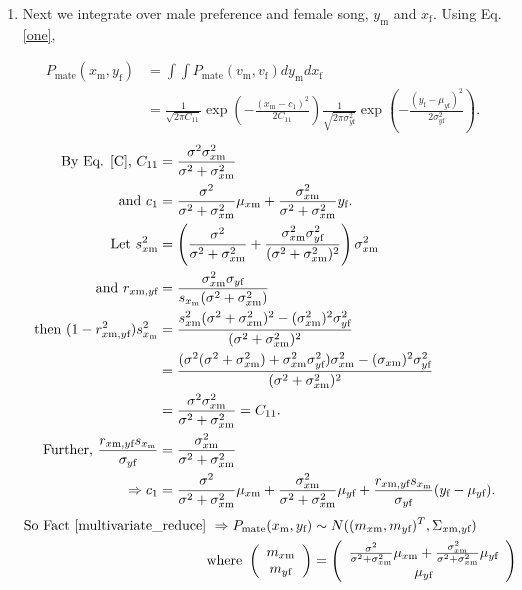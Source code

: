 \documentclass{article}
\newcommand{\x}[1]{\text{#1}}
\begin{document}
\begin{pf}
\begin{enumerate}
\item Next we integrate over male preference and female song, $y_\x{m}$ and $x_\x{f}$. Using Eq. \ref{one},

\begin{align*}
P_\text{mate}(x_\x{m},y_\x{f})&=\int \int P_\text{mate}(v_\x{m},v_\x{f})dy_\x{m}dx_\x{f}
\\&=\frac{1}{\sqrt{2\pi C_{11}}}\exp\left(-\frac{(x_\x{m}-c_1)^2}{2C_{11}}\right)\frac{1}{\sqrt{2\pi \sigma_{y\x{f}}^2}}\exp\left(-\frac{(y_\x{f}-\mu_{y\x{f}})^2}{2\sigma_{y\x{f}}^2}\right).
\end{align*}
\begin{align*}
\text{By Eq. \ref{C}, } C_{11}&=\frac{\sigma^2\sigma_{x\x{m}}^2}{\sigma^2+\sigma_{x\x{m}}^2}
\\ \text{ and } c_1&=\frac{\sigma^2}{\sigma^2+\sigma_{x\x{m}}^2}\mu_{x\x{m}}+\frac{\sigma_{x\x{m}}^2}{\sigma^2+\sigma_{x\x{m}}^2}y_\x{f}.
\\ \text{ Let } s_{x\x{m}}^2&=\left(\frac{\sigma^2}{\sigma^2+\sigma_{x\x{m}}^2}+\frac{\sigma_{x\x{m}}^2\sigma_{y\x{f}}^2}{(\sigma^2+\sigma_{x\x{m}}^2)^2}\right)\sigma_{x\x{m}}^2
\\ \text{ and } r_{x\x{m},y\x{f}}&=\frac{\sigma_{x\x{m}}^2\sigma_{y\x{f}}}{s_{x_\x{m}}(\sigma^2+\sigma_{x\x{m}}^2)}
\\ \text{ then } (1-r_{x\x{m},y\x{f}}^2)s_{x_\x{m}}^2&=\frac{s_{x\x{m}}^2(\sigma^2+\sigma_{x\x{m}}^2)^2-(\sigma_{x\x{m}}^2)^2\sigma_{y\x{f}}^2}{(\sigma^2+\sigma_{x\x{m}}^2)^2}
\\&=\frac{(\sigma^2(\sigma^2+\sigma_{x\x{m}}^2)+\sigma_{x\x{m}}^2\sigma_{y\x{f}}^2)\sigma_{x\x{m}}^2-(\sigma_{x\x{m}})^2\sigma_{y\x{f}}^2}{(\sigma^2+\sigma_{x\x{m}}^2)^2}
\\&=\frac{\sigma^2\sigma_{x\x{m}}^2}{\sigma^2+\sigma_{x\x{m}}^2}=C_{11}.
\\\text{ Further, } \frac{r_{x\x{m},y\x{f}}s_{x_\x{m}}}{\sigma_{y\x{f}}}&=\frac{\sigma_{x\x{m}}^2}{\sigma^2+\sigma_{x\x{m}}^2}
\\ \Rightarrow c_1&=\frac{\sigma^2}{\sigma^2+\sigma_{x\x{m}}^2}\mu_{x\x{m}}+\frac{\sigma_{x\x{m}}^2}{\sigma^2+\sigma_{x\x{m}}^2}\mu_{y\x{f}}+\frac{r_{x\x{m},y\x{f}}s_{x_\x{m}}}{\sigma_{y\x{f}}}(y_\x{f}-\mu_{y\x{f}}).
\end{align*}
\begin{align*}
\text{So Fact \ref{multivariate_reduce} } \Rightarrow P_\text{mate}(x_\x{m},y_\x{f})&\sim N((m_{x\x{m}},m_{y\x{f}})^T,\Sigma_{x\x{m},y\x{f}})
\\ \text{ where } \left(\begin{array}{c}m_{x\x{m}} \\ m_{y\x{f}} \end{array}\right)&=\left(\begin{array}{c}\frac{\sigma^2}{\sigma^2+\sigma_{x\x{m}}^2}\mu_{x\x{m}}+\frac{\sigma_{x\x{m}}^2}{\sigma^2+\sigma_{x\x{m}}^2}\mu_{y\x{f}} \\ \mu_{y\x{f}} \end{array}\right)

\end{align*}
\end{enumerate}
\end{pf}
\end{document}
